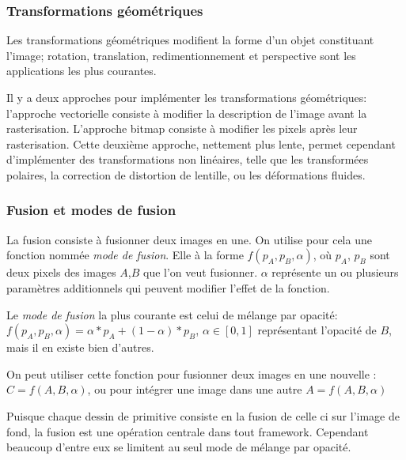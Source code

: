 			\subsubsection{Transformations géométriques}
				Les transformations géométriques modifient la forme d'un objet constituant l'image; rotation, translation, 
				redimentionnement et perspective sont les applications les plus courantes. 
				
				Il y a deux approches pour implémenter les transformations
				géométriques: l'approche vectorielle consiste à modifier la description de l'image avant la rasterisation. L'approche
				bitmap consiste à modifier les pixels après leur rasterisation. Cette deuxième approche, nettement plus lente, permet
				cependant d'implémenter des transformations non linéaires, telle que les transformées polaires, la correction de distortion de 
				lentille, ou les déformations fluides. 
				
			\subsubsection{Fusion et modes de fusion}
				La fusion consiste à fusionner deux images en une. On utilise pour cela une fonction nommée \emph{mode de fusion}.
				Elle à la forme $f(p_A ,p_B ,\alpha)$, où $p_A$, $p_B$ sont deux pixels des images $A$,$B$ que l'on veut fusionner. 
				$\alpha$ représente un ou plusieurs paramètres additionnels qui peuvent	modifier l'effet de la fonction.

				Le \emph{mode de fusion} la plus courante est celui de mélange par opacité: $f(p_A, p_B, \alpha) = \alpha * p_A + (1-\alpha) * p_B$,  $\alpha \in [0,1]$ 
				représentant l'opacité de $B$, mais il en existe bien d'autres.

				On peut utiliser cette fonction pour fusionner deux images en une nouvelle : $ C = f(A,B,\alpha)$, ou pour intégrer une image dans
				une autre $A = f(A,B,\alpha)$

				Puisque chaque dessin de primitive consiste en la fusion de celle ci sur l'image de fond, la fusion est une opération centrale
				dans tout framework. Cependant beaucoup d'entre eux se limitent au seul mode de mélange par opacité.

